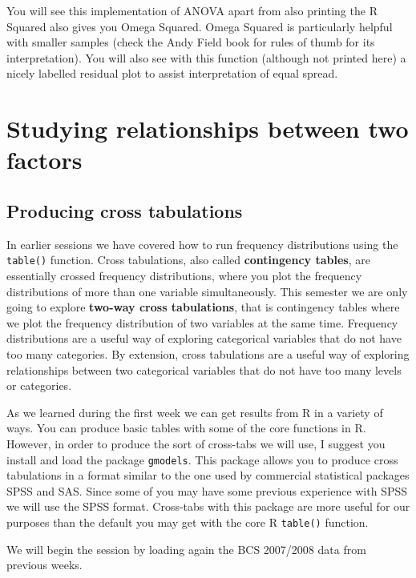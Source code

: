 \documentclass[
]{book}
\begin{document}
You will see this implementation of ANOVA apart from also printing the R Squared also gives you Omega Squared. Omega Squared is particularly helpful with smaller samples (check the Andy Field book for rules of thumb for its interpretation). You will also see with this function (although not printed here) a nicely labelled residual plot to assist interpretation of equal spread.

\hypertarget{studying-relationships-between-two-factors}{%
\chapter{Studying relationships between two factors}\label{studying-relationships-between-two-factors}}

\hypertarget{producing-cross-tabulations}{%
\section{Producing cross tabulations}\label{producing-cross-tabulations}}

In earlier sessions we have covered how to run frequency distributions using the \texttt{table()} function. Cross tabulations, also called \textbf{contingency tables}, are essentially crossed frequency distributions, where you plot the frequency distributions of more than one variable simultaneously. This semester we are only going to explore \textbf{two-way cross tabulations}, that is contingency tables where we plot the frequency distribution of two variables at the same time. Frequency distributions are a useful way of exploring categorical variables that do not have too many categories. By extension, cross tabulations are a useful way of exploring relationships between two categorical variables that do not have too many levels or categories.

As we learned during the first week we can get results from R in a variety of ways. You can produce basic tables with some of the core functions in R. However, in order to produce the sort of cross-tabs we will use, I suggest you install and load the package \texttt{gmodels}. This package allows you to produce cross tabulations in a format similar to the one used by commercial statistical packages SPSS and SAS. Since some of you may have some previous experience with SPSS we will use the SPSS format. Cross-tabs with this package are more useful for our purposes than the default you may get with the core R \texttt{table()} function.

We will begin the session by loading again the BCS 2007/2008 data from previous weeks.
\end{document}
